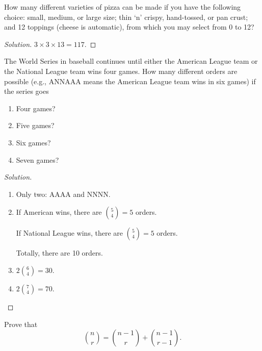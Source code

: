 \documentclass[class=probandstats,crop=false]{standalone}
\begin{document}
\begin{exercise}
    \par How many different varieties of pizza can be made if you have the following choice: small, medium, or large size; thin `n' crispy, hand-tossed, or pan crust; and 12 toppings (cheese is automatic), from which you may select from 0 to 12?
\end{exercise}

\begin{proof}[Solution]
    $3 \times 3 \times 13 = 117$.
\end{proof}

\begin{exercise}
    \par The World Series in baseball continues until either the American League team or the National League team wins four games. How many different orders are possible (e.g., ANNAAA means the American League team wins in six games) if the series goes
    \begin{enumerate}[label = \textbf{(\alph*)}]
        \item Four games?
        \item Five games?
        \item Six games?
        \item Seven games?
    \end{enumerate}
\end{exercise}

\begin{proof}[Solution]
    \begin{enumerate}[label = \textbf{(\alph*)}]
        \item Only two: AAAA and NNNN.
        \item If American wins, there are $\binom{5}{4} = 5$ orders.
              \par If National League wins, there are $\binom{5}{4} = 5$ orders.
              \par Totally, there are 10 orders.
        \item $2\binom{6}{4} = 30$.
        \item $2\binom{7}{4} = 70$.
    \end{enumerate}
\end{proof}

\begin{exercise}
    \par Prove that
    \[
        \binom{n}{r} = \binom{n-1}{r} + \binom{n-1}{r-1}.
    \]
\end{exercise}
\end{document}
